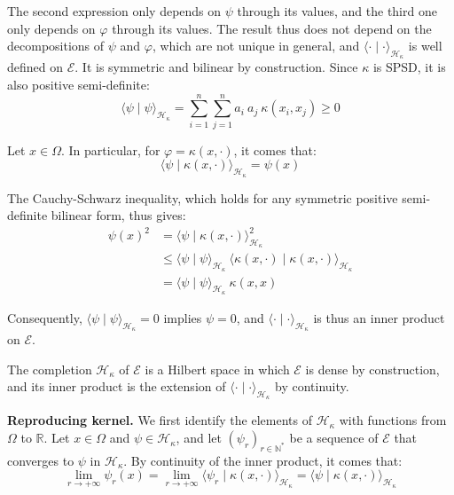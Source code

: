 The second expression only depends on $\psi$ through its values, and the third one only depends on $\varphi$ through its values. The result thus does not depend on the decompositions of $\psi$ and $\varphi$, which are not unique in general, and $\langle\cdot\mid\cdot\rangle_{\mathcal{H}_\kappa}$ is well defined on $\mathcal{E}$. It is symmetric and bilinear by construction. Since $\kappa$ is SPSD, it is also positive semi-definite:
\begin{equation}
	\langle\psi\mid\psi\rangle_{\mathcal{H}_\kappa}=\sum_{i=1}^n\sum_{j=1}^na_i\:a_j\:\kappa(x_i,x_j)\geq0
\end{equation}

Let $x\in\Omega$. In particular, for $\varphi=\kappa(x,\cdot)$, it comes that:
\begin{equation}
	\langle\psi\mid \kappa(x,\cdot)\rangle_{\mathcal{H}_\kappa}=\psi(x)
\end{equation}

The Cauchy-Schwarz inequality, which holds for any symmetric positive semi-definite bilinear form, thus gives:
\begin{equation}
	\begin{aligned}
	\psi(x)^2&=\langle\psi\mid \kappa(x,\cdot)\rangle_{\mathcal{H}_\kappa}^2\\
	&\leq\langle\psi\mid\psi\rangle_{\mathcal{H}_\kappa}\:\langle \kappa(x,\cdot)\mid \kappa(x,\cdot)\rangle_{\mathcal{H}_\kappa}\\
	&=\langle\psi\mid\psi\rangle_{\mathcal{H}_\kappa}\:\kappa(x,x)
	\end{aligned}
\end{equation}

Consequently, $\langle\psi\mid\psi\rangle_{\mathcal{H}_\kappa}=0$ implies $\psi=0$, and $\langle\cdot\mid\cdot\rangle_{\mathcal{H}_\kappa}$ is thus an inner product on $\mathcal{E}$.

The completion $\mathcal{H}_\kappa$ of $\mathcal{E}$ is a Hilbert space in which $\mathcal{E}$ is dense by construction, and its inner product is the extension of $\langle\cdot\mid\cdot\rangle_{\mathcal{H}_\kappa}$ by continuity.

\textbf{Reproducing kernel.} We first identify the elements of $\mathcal{H}_\kappa$ with functions from $\Omega$ to $\mathbb{R}$. Let $x\in\Omega$ and $\psi\in\mathcal{H}_\kappa$, and let $(\psi_r)_{r\in\mathbb{N}^*}$ be a sequence of $\mathcal{E}$ that converges to $\psi$ in $\mathcal{H}_\kappa$. By continuity of the inner product, it comes that:
\begin{equation}
	\lim_{r\to+\infty}\psi_r(x)=\lim_{r\to+\infty}\langle\psi_r\mid \kappa(x,\cdot)\rangle_{\mathcal{H}_\kappa}=\langle\psi\mid \kappa(x,\cdot)\rangle_{\mathcal{H}_\kappa}
\end{equation}

